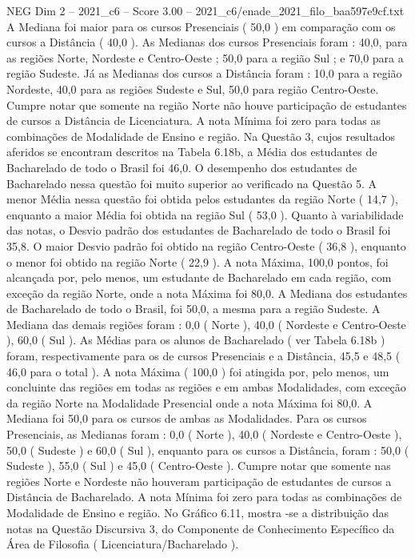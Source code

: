 \begin{textsample}{NEG Dim 2 – 2021\_c6 – Score 3.00 – 2021\_c6/enade\_2021\_filo\_baa597e9cf.txt}
A Mediana foi maior para os cursos Presenciais ( 50,0 ) em comparação com os cursos a Distância ( 40,0 ).
As Medianas dos cursos Presenciais foram : 40,0, para as regiões Norte, Nordeste e Centro-Oeste ; 50,0 para a região Sul ; e 70,0 para a região Sudeste.
Já as Medianas dos cursos a Distância foram : 10,0 para a região Nordeste, 40,0 para as regiões Sudeste e Sul, 50,0 para região Centro-Oeste.
Cumpre notar que somente na região Norte não houve participação de estudantes de cursos a Distância de Licenciatura.
A nota Mínima foi zero para todas as combinações de Modalidade de Ensino e região.
Na Questão 3, cujos resultados aferidos se encontram descritos na Tabela 6.18b, a Média dos estudantes de Bacharelado de todo o Brasil foi 46,0.
O desempenho dos estudantes de Bacharelado nessa questão foi muito superior ao verificado na Questão 5.
A menor Média nessa questão foi obtida pelos estudantes da região Norte ( 14,7 ), enquanto a maior Média foi obtida na região Sul ( 53,0 ).
Quanto à variabilidade das notas, o Desvio padrão dos estudantes de Bacharelado de todo o Brasil foi 35,8.
O maior Desvio padrão foi obtido na região Centro-Oeste ( 36,8 ), enquanto o menor foi obtido na região Norte ( 22,9 ).
A nota Máxima, 100,0 pontos, foi alcançada por, pelo menos, um estudante de Bacharelado em cada região, com exceção da região Norte, onde a nota Máxima foi 80,0.
A Mediana dos estudantes de Bacharelado de todo o Brasil, foi 50,0, a mesma para a região Sudeste.
A Mediana das demais regiões foram : 0,0 ( Norte ), 40,0 ( Nordeste e Centro-Oeste ), 60,0 ( Sul ).
As Médias para os alunos de Bacharelado ( ver Tabela 6.18b ) foram, respectivamente para os de cursos Presenciais e a Distância, 45,5 e 48,5 ( 46,0 para o total ).
A nota Máxima ( 100,0 ) foi atingida por, pelo menos, um concluinte das regiões em todas as regiões e em ambas Modalidades, com exceção da região Norte na Modalidade Presencial onde a nota Máxima foi 80,0.
A Mediana foi 50,0 para os cursos de ambas as Modalidades.
Para os cursos Presenciais, as Medianas foram : 0,0 ( Norte ), 40,0 ( Nordeste e Centro-Oeste ), 50,0 ( Sudeste ) e 60,0 ( Sul ), enquanto para os cursos a Distância, foram : 50,0 ( Sudeste ), 55,0 ( Sul ) e 45,0 ( Centro-Oeste ).
Cumpre notar que somente nas regiões Norte e Nordeste não houveram participação de estudantes de cursos a Distância de Bacharelado.
A nota Mínima foi zero para todas as combinações de Modalidade de Ensino e região.
No Gráfico 6.11, mostra -se a distribuição das notas na Questão Discursiva 3, do Componente de Conhecimento Específico da Área de Filosofia ( Licenciatura/Bacharelado ).

\end{textsample}
